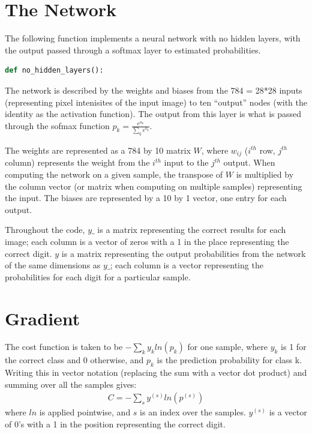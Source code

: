 \documentclass{article}
\begin{document}
   \section{The Network}
   The following function implements a neural network with no hidden layers, with the
   output passed through a softmax layer to estimated probabilities.

   \begin{lstlisting}[language=Python]
      def no_hidden_layers():
   \end{lstlisting}

   The network is described by the weights and biases from the 784 = 28*28 inputs
   (representing pixel intenisites of the input image) to ten ``output'' nodes
   (with the identity as the activation function). The output from this layer is what is
   passed through the sofmax function $p_k = \frac{ e^{o_k} }{ \sum_q e^{o_q}}$.

   The weights are represented as a 784 by 10 matrix $W$, where $w_{ij}$ ($i^{th}$ row, $j^{th}$
   column) represents the weight from the $i^{th}$ input to the $j^{th}$ output.
   When computing the network on a given sample, the transpose of $W$ is multiplied
   by the column vector (or matrix when computing on multiple samples) representing the input.
   The biases are represented by a 10 by 1 vector, one entry for each output.

   Throughout the code, $y\_$ is a matrix representing the correct results for each image; each column is a
   vector of zeros with a 1 in the place representing the correct digit.
   $y$ is a matrix representing the output probabilities from the network of the same dimensions
   as $y\_$; each column is a vector representing the probabilities for each digit for a
   particular sample.

   \section{Gradient}
   The cost function is taken to be $- \sum_{k} y_k ln(p_k)$ for one sample, where $y_k$ is
   1 for the correct class and 0 otherwise, and $p_k$ is the prediction probability for class k.
   Writing this in vector notation (replacing the sum with a vector dot product) and
   summing over all the samples gives:
      \begin{equation*} \begin{split}
         C = - \sum_{s} y^{(s)} ln(p^{(s)})
      \end{split} \end{equation*}
   where $ln$ is applied pointwise, and $s$ is an index over the samples. $y^{(s)}$ is
   a vector of 0's with a 1 in the position representing the correct digit.
\end{document}
